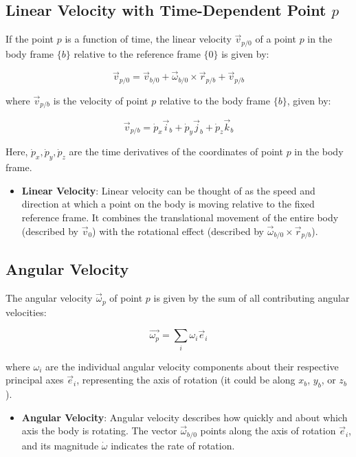 \subsection{Linear Velocity with Time-Dependent Point \( p \)}

If the point \( p \) is a function of time, the linear velocity \( \vec{v}_{p/0} \) of a point \( p \) in the body frame \( \{b\} \) relative to the reference frame \( \{0\} \) is given by:

\[
\vec{v}_{p/0} = \vec{v}_{b/0} + \vec{\omega}_{b/0} \times \vec{r}_{p/b} + \vec{v}_{p/b}
\]

where \( \vec{v}_{p/b} \) is the velocity of point \( p \) relative to the body frame \( \{b\} \), given by:

\[
\vec{v}_{p/b} = \dot{p}_x \vec{i}_b + \dot{p}_y \vec{j}_b + \dot{p}_z \vec{k}_b
\]

Here, \( \dot{p}_x, \dot{p}_y, \dot{p}_z \) are the time derivatives of the coordinates of point \( p \) in the body frame.


\begin{itemize}
    \item \textbf{Linear Velocity}: Linear velocity can be thought of as the speed and direction at which a point on the body is moving relative to the fixed reference frame. It combines the translational movement of the entire body (described by \( \vec{v}_0 \)) with the rotational effect (described by \( \vec{\omega}_{b/0} \times \vec{r}_{p/b} \)).
    
\end{itemize}

\subsection{Angular Velocity}

The angular velocity \( \vec{\omega}_{p} \) of point \( p \) is given by the sum of all contributing angular velocities:

\[
\vec{\omega_{p}} = \sum_{i} \omega_i \vec{e}_i
\]

where \( \omega_i \) are the individual angular velocity components about their respective principal axes \( \vec{e}_i \), representing the axis of rotation (it could be along $x_b$, $y_b$, or $z_b$).

\begin{itemize}
     \item \textbf{Angular Velocity}: Angular velocity describes how quickly and about which axis the body is rotating. The vector \( \vec{\omega}_{b/0} \) points along the axis of rotation \( \vec{e}_i \), and its magnitude \( \dot{\omega} \) indicates the rate of rotation.
\end{itemize}

